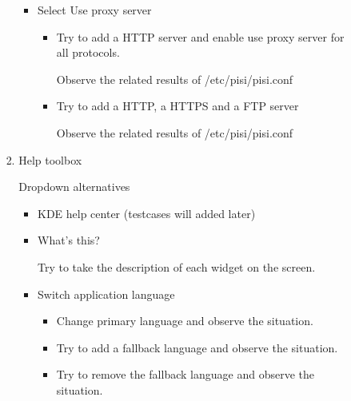 \documentclass[a4paper,10pt]{article}
\begin{document}
\begin{enumerate}
\begin{enumerate}
\begin{enumerate}
\begin{enumerate}
\begin{itemize}
                    \item Select Use proxy server
    
                    \begin{itemize}
                        \item Try to add a HTTP server and enable use proxy server for all protocols.
        
                        Observe the related results of /etc/pisi/pisi.conf
        
                        \item Try to add a HTTP, a HTTPS and a FTP server
        
                        Observe the related results of /etc/pisi/pisi.conf
                    \end{itemize}
                \end{itemize}
                \item Help toolbox
    
                Dropdown alternatives
                \begin{itemize}
                    \item KDE help center (testcases will added later)
                    \item What's this? 
        
                    Try to take the description of each widget on the screen.
                    \item Switch application language
                    \begin{itemize}
                        \item Change primary language and observe the situation.
                        \item Try to add a fallback language and observe the situation.
                        \item Try to remove the fallback language and observe the situation.
                    \end{itemize}
                \end{itemize}
        \end{enumerate}
    \end{enumerate}
\end{enumerate}


\end{enumerate}
\end{document}
